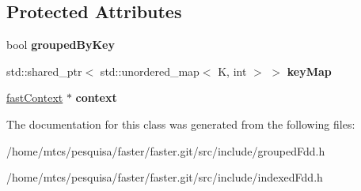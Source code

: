 \subsection*{Protected Attributes}
\begin{DoxyCompactItemize}
\item 
\hypertarget{classfaster_1_1iFddCore_a0fdbb128eb02349bcf1eedd637b70d7c}{}bool {\bfseries grouped\+By\+Key}\label{classfaster_1_1iFddCore_a0fdbb128eb02349bcf1eedd637b70d7c}

\item 
\hypertarget{classfaster_1_1iFddCore_a9a666ebb96e022ca9c0b221f670e2e8d}{}std\+::shared\+\_\+ptr$<$ std\+::unordered\+\_\+map$<$ K, int $>$ $>$ {\bfseries key\+Map}\label{classfaster_1_1iFddCore_a9a666ebb96e022ca9c0b221f670e2e8d}

\item 
\hypertarget{classfaster_1_1iFddCore_a698ad6bbac1d23c82f83bac07cd49c02}{}\hyperlink{classfaster_1_1fastContext}{fast\+Context} $\ast$ {\bfseries context}\label{classfaster_1_1iFddCore_a698ad6bbac1d23c82f83bac07cd49c02}

\end{DoxyCompactItemize}


The documentation for this class was generated from the following files\+:\begin{DoxyCompactItemize}
\item 
/home/mtcs/pesquisa/faster/faster.\+git/src/include/grouped\+Fdd.\+h\item 
/home/mtcs/pesquisa/faster/faster.\+git/src/include/indexed\+Fdd.\+h\end{DoxyCompactItemize}
